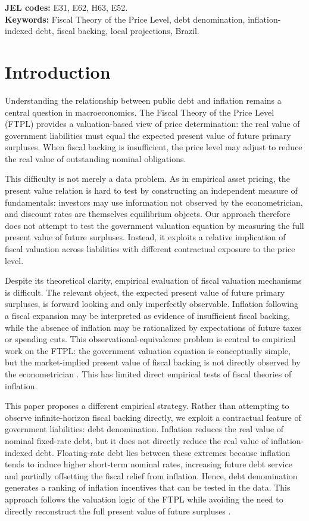 \documentclass[12pt,a4paper]{article}
\begin{document}
\noindent \textbf{JEL codes:} E31, E62, H63, E52.\\
\textbf{Keywords:} Fiscal Theory of the Price Level, debt denomination, inflation-indexed debt, fiscal backing, local projections, Brazil.

\section{Introduction}

Understanding the relationship between public debt and inflation remains a central question in macroeconomics. The Fiscal Theory of the Price Level (FTPL) provides a valuation-based view of price determination: the real value of government liabilities must equal the expected present value of future primary surpluses. When fiscal backing is insufficient, the price level may adjust to reduce the real value of outstanding nominal obligations.

This difficulty is not merely a data problem. As in empirical asset pricing, the present value relation is hard to test by constructing an independent measure of fundamentals: investors may use information not observed by the econometrician, and discount rates are themselves equilibrium objects. Our approach therefore does not attempt to test the government valuation equation by measuring the full present value of future surpluses. Instead, it exploits a relative implication of fiscal valuation across liabilities with different contractual exposure to the price level.

Despite its theoretical clarity, empirical evaluation of fiscal valuation mechanisms is difficult. The relevant object, the expected present value of future primary surpluses, is forward looking and only imperfectly observable. Inflation following a fiscal expansion may be interpreted as evidence of insufficient fiscal backing, while the absence of inflation may be rationalized by expectations of future taxes or spending cuts. This observational-equivalence problem is central to empirical work on the FTPL: the government valuation equation is conceptually simple, but the market-implied present value of fiscal backing is not directly observed by the econometrician \citep{Cochrane2023,Cochrane2026}. This has limited direct empirical tests of fiscal theories of inflation.

This paper proposes a different empirical strategy. Rather than attempting to observe infinite-horizon fiscal backing directly, we exploit a contractual feature of government liabilities: debt denomination. Inflation reduces the real value of nominal fixed-rate debt, but it does not directly reduce the real value of inflation-indexed debt. Floating-rate debt lies between these extremes because inflation tends to induce higher short-term nominal rates, increasing future debt service and partially offsetting the fiscal relief from inflation. Hence, debt denomination generates a ranking of inflation incentives that can be tested in the data. This approach follows the valuation logic of the FTPL while avoiding the need to directly reconstruct the full present value of future surpluses \citep{Cochrane2023,Cochrane2026}.
\end{document}
